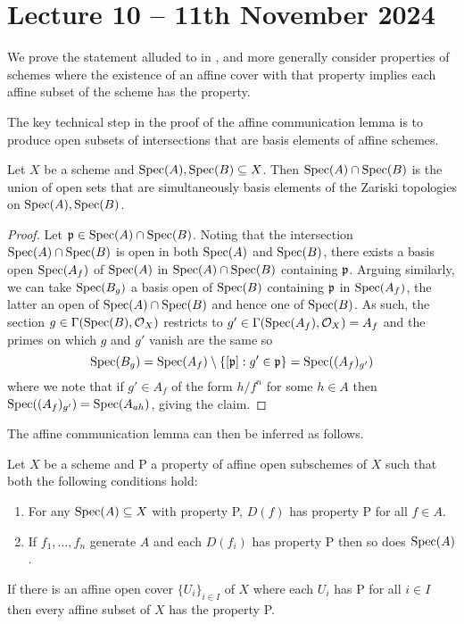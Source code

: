 \section{Lecture 10 -- 11th November 2024}\label{sec: lecture 10}
We prove the statement alluded to in , and more generally consider properties of schemes where the existence of an affine cover with that property implies each affine subset of the scheme has the property.

The key technical step in the proof of the affine communication lemma is to produce open subsets of intersections that are basis elements of affine schemes. 
\begin{lemma}\label{lem: simultaneously distinguished opens}
    Let $X$ be a scheme and $\operatorname{Spec}(A),\operatorname{Spec}(B)\subseteq X$. Then $\operatorname{Spec}(A)\cap\operatorname{Spec}(B)$ is the union of open sets that are simultaneously basis elements of the Zariski topologies on $\operatorname{Spec}(A),\operatorname{Spec}(B)$. 
\end{lemma}
\begin{proof}
    Let $\mathfrak{p}\in\operatorname{Spec}(A)\cap\operatorname{Spec}(B)$. Noting that the intersection $\operatorname{Spec}(A)\cap\operatorname{Spec}(B)$ is open in both $\operatorname{Spec}(A)$ and $\operatorname{Spec}(B)$, there exists a basis open $\operatorname{Spec}(A_{f})$ of $\operatorname{Spec}(A)$ in $\operatorname{Spec}(A)\cap\operatorname{Spec}(B)$ containing $\mathfrak{p}$. Arguing similarly, we can take $\operatorname{Spec}(B_{g})$ a basis open of $\operatorname{Spec}(B)$ containing $\mathfrak{p}$ in $\operatorname{Spec}(A_{f})$, the latter an open of $\operatorname{Spec}(A)\cap\operatorname{Spec}(B)$ and hence one of $\operatorname{Spec}(B)$. As such, the section $g\in\Gamma(\operatorname{Spec}(B),\mathcal{O}_{X})$ restricts to $g'\in\Gamma(\operatorname{Spec}(A_{f}),\mathcal{O}_{X})=A_{f}$ and the primes on which $g$ and $g'$ vanish are the same so 
    $$\operatorname{Spec}(B_{g})=\operatorname{Spec}(A_{f})\setminus\{[\mathfrak{p}]:g'\in\mathfrak{p}\}=\operatorname{Spec}((A_{f})_{g'})$$
    where we note that if $g'\in A_{f}$ of the form $h/f^{n}$ for some $h\in A$ then $\operatorname{Spec}((A_{f})_{g'})=\operatorname{Spec}(A_{ah})$, giving the claim. 
\end{proof}
The affine communication lemma can then be inferred as follows. 
\begin{lemma}\label{lem: affine communication}
    Let $X$ be a scheme and P a property of affine open subschemes of $X$ such that both the following conditions hold:
    \begin{enumerate}[label=(\roman*)]
        \item For any $\operatorname{Spec}(A)\subseteq X$ with property P, $D(f)$ has property P for all $f\in A$. 
        \item If $f_{1},\dots,f_{n}$ generate $A$ and each $D(f_{i})$ has property P then so does $\operatorname{Spec}(A)$. 
    \end{enumerate}
    If there is an affine open cover $\{U_{i}\}_{i\in I}$ of $X$ where each $U_{i}$ has P for all $i\in I$ then every affine subset of $X$ has the property P. 
\end{lemma}
